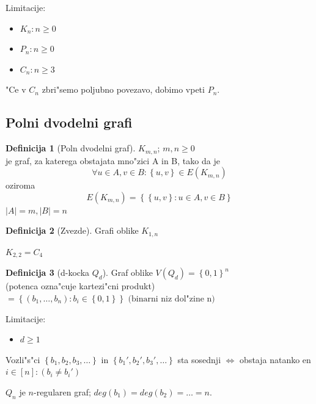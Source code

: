 \documentclass{article}
\theoremstyle{definition}
\newtheorem{definition}{Definicija}[section]
\begin{document}
	Limitacije:
	\begin{itemize}
		\item $K_n: n \geq 0$ 
		\item $P_n: n \geq 0$ 
		\item $C_n: n \geq 3$
	\end{itemize}

	"Ce v $C_n$ zbri"semo poljubno povezavo, dobimo vpeti $P_n$.
	
	\subsection{Polni dvodelni grafi}
	\begin{definition}[Poln dvodelni graf]
		$K_{m,n}$; $m,n \geq 0$ \\ 
		je graf, za katerega obstajata mno"zici A in B, tako da je
		$$ \forall u \in A, v \in B: \left\lbrace u,v \right\rbrace \in E(K_{m,n})$$
		oziroma
		$$E(K_{m,n}) = \left\lbrace\left\lbrace u,v\right\rbrace: u \in A, v \in B\right\rbrace$$
		$|A| = m, |B| = n$ 		
	\end{definition} 
	\begin{definition}[Zvezde]
			Grafi oblike $K_{1,n}$
	\end{definition}
	$K_{2,2} = C_4$
	
	\begin{definition}[d-kocka $Q_d$]
		Graf oblike $V(Q_d) = \left\lbrace 0,1 \right\rbrace ^n$ \\
		(potenca ozna"cuje kartezi"cni produkt) \\
		$= \left\lbrace (b_1, \ldots, b_n): b_i \in \left\lbrace 0,1\right\rbrace\right\rbrace \text{ (binarni niz dol"zine n) }$
	\end{definition}

	Limitacije:
	\begin{itemize}
		\item $d \geq 1$
	\end{itemize}
	
	Vozli"s"ci $\left\lbrace b_1, b_2, b_3, \ldots \right\rbrace$ in $\left\lbrace b_1', b_2', b_3', \ldots \right\rbrace$ sta sosednji $\iff$ obstaja natanko en $i \in [n]: (b_i \neq b_i')$
	
	$Q_n$ je $n$-regularen graf; $deg(b_1) = deg(b_2) = \ldots = n$.
	
\end{document}
